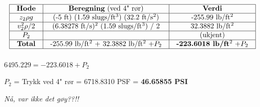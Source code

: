 
$$\vbox{\offinterlineskip
\halign{\strut
\vrule \quad\hfil # \ \hfil & 
\vrule \quad\hfil # \ \hfil & 
\vrule \quad\hfil # \ \hfil \vrule \cr
\noalign{\hrule}
%
{\bf Hode} & {\bf Beregning} (ved 4" rør) & {\bf Verdi} \cr
%
\noalign{\hrule}
%
$z_2 \rho g$ & (-5 ft) (1.59 slugs/ft$^{3}$) (32.2 ft/s$^{2}$) & -255.99 lb/ft$^{2}$ \cr
%
\noalign{\hrule}
%
$v_2^2 \rho / 2$ & (6.38278 ft/s)$^{2}$ (1.59 slugs/ft$^{3}$) / 2 & 32.3882 lb/ft$^{2}$ \cr
%
\noalign{\hrule}
%
$P_2$ &  & (ukjent) \cr
%
\noalign{\hrule}
%
{\bf Total} &  -255.99 lb/ft$^{2}$ + 32.3882 lb/ft$^{2}$ $+ P_2$ & {\bf -223.6018 lb/ft$^{2}$} $+ P_2$ \cr
%
\noalign{\hrule}
} %
}$$ %

$6495.229 = -223.6018 + P_2$

\vskip 10pt

$P_2$ = Trykk ved 4" rør = 6718.8310 PSF = {\bf 46.65855 PSI}

\vskip 10pt

{\it Nå, var ikke det gøy??!!}


